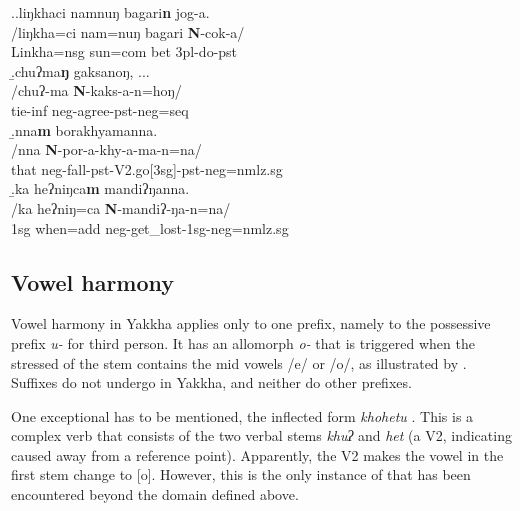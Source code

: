 \ex.\a.\glll liŋkhaci namnuŋ bagari\textbf{n} jog-a.\\
/liŋkha=ci     nam=nuŋ      bagari {\bf N}-cok-a/\\
Linkha{\sc =nsg} sun{\sc =com} bet {\sc 3pl-}do{\sc -pst}		\\
 
\b.\glll  chuʔma\textbf{ŋ} gaksanoŋ, ...\\
/chuʔ-ma  {\bf N}-kaks-a-n=hoŋ/\\
tie{\sc -inf} {\sc neg-}agree{\sc [3sg]-pst-neg=seq}\\
  
\b.\glll  nna\textbf{m} borakhyamanna.\\
 /nna {\bf N}-por-a-khy-a-ma-n=na/\\
that {\sc neg-}fall{\sc -pst-V2.go[3sg]-pst-neg=nmlz.sg}\\
 
\b.\glll  ka heʔniŋca\textbf{m} mandiʔŋanna.\\
/ka heʔniŋ=ca {\bf N}-mandiʔ-ŋa-n=na/\\
{\sc 1sg} when{\sc =add} {\sc neg-}get\_lost{\sc -1sg-neg=nmlz.sg}\\
					
			
			
\subsection{Vowel harmony}\label{vow-har}

Vowel harmony in Yakkha applies only to one prefix, namely to the possessive prefix  \emph{u-} for third person. It has an allomorph \emph{o-} that is triggered when the stressed  of the stem contains the mid vowels /e/ or /o/, as illustrated by . Suffixes do not  undergo  in Yakkha, and neither do other prefixes. 

One  exceptional  has to be mentioned, the inflected form \emph{khohetu} . This is a complex verb that consists of the two verbal stems \emph{khuʔ}  and \emph{het} (a V2, indicating caused  away from a reference point). Apparently, the V2 makes the vowel in the first stem change to [o]. However, this is the only instance of  that has been encountered beyond the domain defined above.



